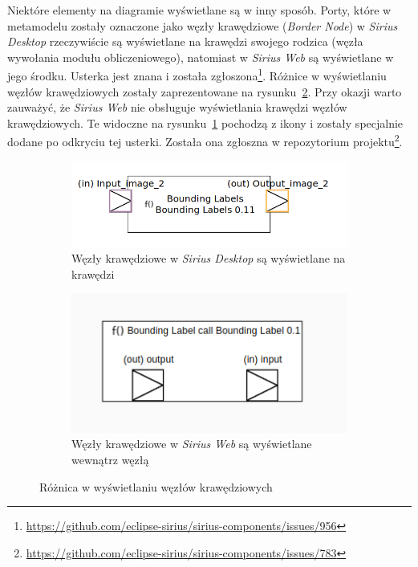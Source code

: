 Niektóre elementy na diagramie wyświetlane są w inny sposób. Porty, które w
metamodelu zostały oznaczone jako węzły krawędziowe (\emph{Border Node}) w
\emph{Sirius Desktop} rzeczywiście są wyświetlane na krawędzi swojego rodzica
(węzła wywołania modułu obliczeniowego), natomiast w \emph{Sirius Web} są
wyświetlane w jego środku. Usterka jest znana i została zgłoszona\footnote{
	\url{https://github.com/eclipse-sirius/sirius-components/issues/956}
}. Różnice w wyświetlaniu węzłów krawędziowych zostały zaprezentowane na
rysunku~\ref{rys:border-node-difference}.
Przy okazji warto zauważyć, że \emph{Sirius Web} nie obsługuje wyświetlania
krawędzi węzłów krawędziowych. Te widoczne na
rysunku~\ref{rys:border-node-sirius-web} pochodzą z ikony i zostały specjalnie
dodane po odkryciu tej usterki. Została ona zgłoszna w repozytorium
projektu\footnote{
	\url{https://github.com/eclipse-sirius/sirius-components/issues/783}}.

\begin{figure}
	\centering
	\begin{subfigure}{.49\textwidth}
		\centering
		\includegraphics[width=.99\linewidth]{./images/border-node-sirius-desktop.png}
		\caption{Węzły krawędziowe w \emph{Sirius Desktop} są wyświetlane na
      krawędzi}
	\end{subfigure}
	\begin{subfigure}{.49\textwidth}
		\centering
		\includegraphics[width=.99\linewidth]{./images/border-node-sirius-web.png}
		\caption{Węzły krawędziowe w \emph{Sirius Web} są wyświetlane wewnątrz
      węzłą}\label{rys:border-node-sirius-web}
	\end{subfigure}

    \caption{Różnica w wyświetlaniu węzłów
      krawędziowych}\label{rys:border-node-difference}
\end{figure}

